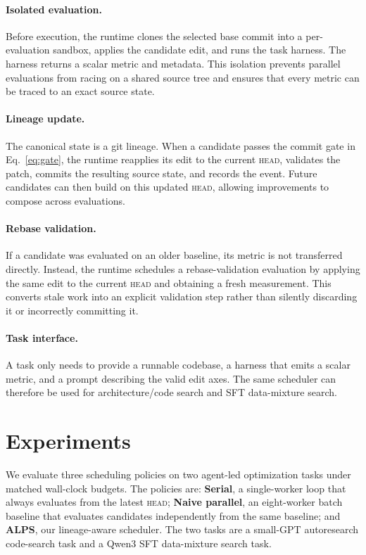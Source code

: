\documentclass{article}
\newcommand{\alps}{ALPS\xspace}
\newcommand{\HEAD}{\textsc{head}\xspace}
\begin{document}
\paragraph{Isolated evaluation.}
Before execution, the runtime clones the selected base commit into a per-evaluation sandbox, applies the candidate edit, and runs the task harness. The harness returns a scalar metric and metadata. This isolation prevents parallel evaluations from racing on a shared source tree and ensures that every metric can be traced to an exact source state.

\paragraph{Lineage update.}
The canonical state is a git lineage. When a candidate passes the commit gate in Eq.~\ref{eq:gate}, the runtime reapplies its edit to the current \HEAD, validates the patch, commits the resulting source state, and records the event. Future candidates can then build on this updated \HEAD, allowing improvements to compose across evaluations.

\paragraph{Rebase validation.}
If a candidate was evaluated on an older baseline, its metric is not transferred directly. Instead, the runtime schedules a rebase-validation evaluation by applying the same edit to the current \HEAD and obtaining a fresh measurement. This converts stale work into an explicit validation step rather than silently discarding it or incorrectly committing it.

\paragraph{Task interface.}
A task only needs to provide a runnable codebase, a harness that emits a scalar metric, and a prompt describing the valid edit axes. The same scheduler can therefore be used for architecture/code search and SFT data-mixture search.


\section{Experiments}
\label{sec:experiments}

We evaluate three scheduling policies on two agent-led optimization tasks under matched wall-clock budgets. The policies are: \textbf{Serial}, a single-worker loop that always evaluates from the latest \HEAD; \textbf{Naive parallel}, an eight-worker batch baseline that evaluates candidates independently from the same baseline; and \textbf{\alps}, our lineage-aware scheduler. The two tasks are a small-GPT autoresearch code-search task and a Qwen3 SFT data-mixture search task.
\end{document}
